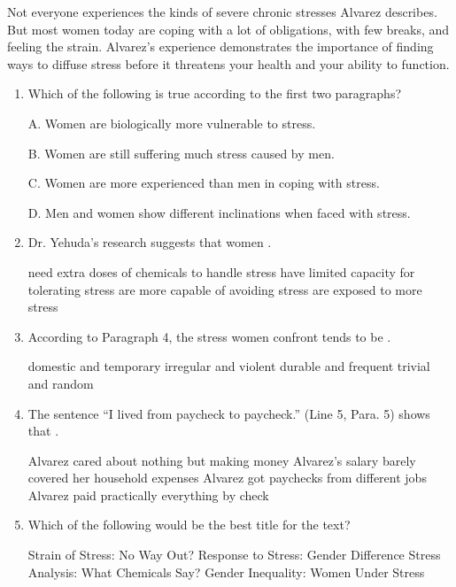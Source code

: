 Not everyone experiences the kinds of severe chronic stresses Alvarez
describes. But most women today are coping with a lot of obligations,
with few breaks, and feeling the strain. Alvarez's experience
demonstrates the importance of finding ways to diffuse stress before it
threatens your health and your ability to function.


\begin{enumerate}[resume]
	\item
 Which of the following is true according to the first two
paragraphs?


A. Women are biologically more vulnerable to stress.


B. Women are still suffering much stress caused by men.


C. Women are more experienced than men in coping with stress.


D. Men and women show different inclinations when faced with
stress.



\item
 Dr. Yehuda's research suggests that women \lineread.


\fourchoices
{need extra doses of chemicals to handle stress}
{have limited capacity for tolerating stress}
{are more capable of avoiding stress}
{are exposed to more stress}




\item
According to Paragraph 4, the stress women confront tends to
be \lineread.


\fourchoices
{domestic and temporary}
{irregular and violent}
{durable and frequent}
{trivial and random}


\item
 The sentence ``I lived from paycheck to paycheck.'' (Line 5,
Para. 5) shows that \lineread.


\fourchoices
{Alvarez cared about nothing but making money}
{Alvarez's salary barely covered her household expenses}
{Alvarez got paychecks from different jobs}
{Alvarez paid practically everything by check}



\item
Which of the following would be the best title for the
text?


\fourchoices
{Strain of Stress: No Way Out?}
{Response to Stress: Gender Difference}
{Stress Analysis: What Chemicals Say?}
{Gender Inequality: Women Under Stress}

\end{enumerate}



